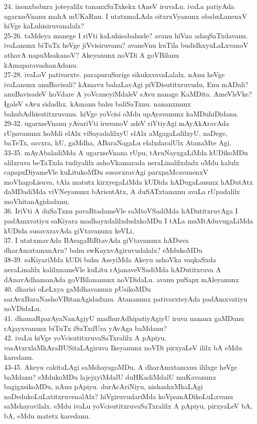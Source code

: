\documentclass{article}
\begin{document}
24. inonxbabxra joteyalilx tananxSaTxkekx tAneV iruvaLu. ivaLa patiyAda ugarxseVnanu mahA mUKaRnu. I utatxmaLAda sitxrxVyanunx obabxLanenxV hiVge kaLuhisiruvanalalx?\\
25-26. taMdeya manege I riVti kaLuhisabahude? avanu hiVna adaqSaTxdavanu. ivaLanunx biTuTx heVge jiVvisiruvanu? avaneVnu kuTila budidhxyuLaLxvanoV athavA napuMsakanoV? Akeyanunx noVDi A goVBilanu kAmaparavashanAdanu.\\
27-28. ivaLoV pativarxte. parapuruSarige sikukxvavaLalalx. nAnu heVge ivaLanunx anuBavisali? kAmavu bahaLavAgi piVDisutitxruvudu, Enu mADali? anuBavisadeV hoVdare A yoVcaneyiMdaleV sAvu nanage KaMDita. AmeVleVke? IgaleV sAvu sidadhx. kAmanu bahu baliSaTxnu. nananxnunx bahubAdhisutitxruvanu. hiVge yoVcisi oMdu upAyavanunx kaMDuhiDidanu.\\
29-32. ugarxseVnanu yAvariVti iruvanoV adeV riVtiyAgi mAyAkAravAda rUpavanunx hoMdi elAlx viSayadalilxyU elAlx aMgagaLalilxyU, naDege, baTeTx, savxra, hU, gaMdha, ABaraNagaLu elalxdaralUlx AtanaMte Agi,\\
33-35. mAyAbaladiMda A ugarxseVnana rUpu, tAruNayxgaLiMda kUDikoMDu alilxruva beTaTxda tudiyalilx ashoVkamarada neraLinalilxdadx oMdu kalulx capapxDiyameVle kuLitukoMDu susavxravAgi parxpaMcavanenxV moVhagoLisuva, tAla matutx kirxyegaLiMda kUDida hADugaLanunx hADutAtx daMDadiMda viVNeyanunx bArisutAtx, A duSATxtamxnu avaLa rUpadalilx moVhitanAgidadxnu.\\
36. IriVti A duSaTxnu pavaRtadameVle saMtoVSadiMda hADutitxruvAga I padAmxvatiyu saKiyara madhayxdalilxdudxkoMDu I tALa muMtAduvugaLiMda kUDida susavxravAda giVtavanunx keVLi,\\
37. I utatxmavAda BAvagaBiRtavAda giVtavanunx hADuva dharAmxtamxnAru? bahu swKayxvAgiruvudalalx? eMdukoMDu\\
38-39. saKiyariMda kUDi bahu AseyiMda Akeyu ashoVka vaqkaSxda neraLinalilx kalilxnameVle kuLitu rAjanaveVSadiMda hADutitxruva A dAnavAdhamanAda goVBilananunx noVDidaLu. avanu puSapx mAleyanunx\\
40. dharisi oLeLxya gaMdhavanunx pUsikoMDu sarAvxBaraNashoVBitanAgidadxnu. Atananunx pativarxteyAda padAmxvatiyu noVDidaLu.\\
41. dhamaRparAyaNanAgiyU madhurAdhipatiyAgiyU iruva nananx gaMDanu rAjayxvanunx biTuTx iSuTxdUra yAvAga baMdanu?\\
42. ivaLu hiVge yoVcisutitxruvaSaTxralilx A pApiyu, vasAtxrxlaMkAraBUSitaLAgiruva Ikeyanunx noVDi pirxyaLeV ililx bA eMdu karedanu.\\
43-45. Akeyu cakitaLAgi saMshayagoMDu, A dharAmxtamxnu ililxge heVge baMdanu? eMdukoMDu lajejxyiMdalU duHKadiMdalU muKavanunx bagigxsikoMDu, nAnu pApiyu. durAcAriNiyu, nishashxMkaLAgi naDedukoLuLxtitxruvenalAlx? hiVgiruvudariMda koVpamADikoLuLxvanu saMshayavilalx. eMdu ivaLu yoVcisutitxruvaSaTxralilx A pApiyu, pirxyaLeV bA, bA, eMdu matetx karedanu.\\
\end{document}
